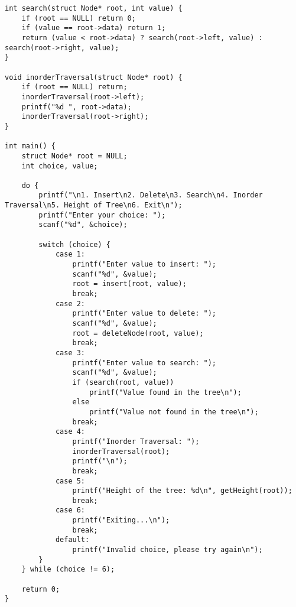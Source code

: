 \documentclass[12pt,a4paper]{article}
\begin{document}
\begin{lstlisting}
int search(struct Node* root, int value) {
    if (root == NULL) return 0;
    if (value == root->data) return 1;
    return (value < root->data) ? search(root->left, value) : search(root->right, value);
}

void inorderTraversal(struct Node* root) {
    if (root == NULL) return;
    inorderTraversal(root->left);
    printf("%d ", root->data);
    inorderTraversal(root->right);
}

int main() {
    struct Node* root = NULL;
    int choice, value;

    do {
        printf("\n1. Insert\n2. Delete\n3. Search\n4. Inorder Traversal\n5. Height of Tree\n6. Exit\n");
        printf("Enter your choice: ");
        scanf("%d", &choice);

        switch (choice) {
            case 1:
                printf("Enter value to insert: ");
                scanf("%d", &value);
                root = insert(root, value);
                break;
            case 2:
                printf("Enter value to delete: ");
                scanf("%d", &value);
                root = deleteNode(root, value);
                break;
            case 3:
                printf("Enter value to search: ");
                scanf("%d", &value);
                if (search(root, value))
                    printf("Value found in the tree\n");
                else
                    printf("Value not found in the tree\n");
                break;
            case 4:
                printf("Inorder Traversal: ");
                inorderTraversal(root);
                printf("\n");
                break;
            case 5:
                printf("Height of the tree: %d\n", getHeight(root));
                break;
            case 6:
                printf("Exiting...\n");
                break;
            default:
                printf("Invalid choice, please try again\n");
        }
    } while (choice != 6);

    return 0;
}
\end{lstlisting}
\end{document}
